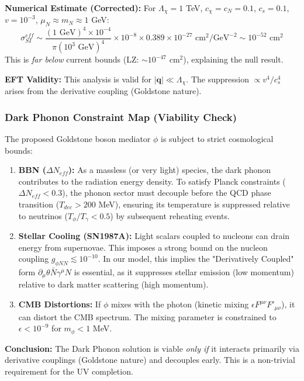 \documentclass[a4paper,12pt]{article}
\begin{document}
\textbf{Numerical Estimate (Corrected):}
For $\Lambda_\chi = 1$ TeV, $c_\chi = c_N = 0.1$, $c_s = 0.1$, $v = 10^{-3}$, $\mu_N \approx m_N \approx 1$ GeV:
\begin{equation}
\sigma_{SI}^{eff} \sim \frac{(1 \text{ GeV})^4 \times 10^{-4}}{\pi (10^3 \text{ GeV})^4} \times 10^{-8} \times 0.389 \times 10^{-27} \text{ cm}^2/\text{GeV}^{-2} \sim 10^{-52} \text{ cm}^2
\end{equation}
This is \emph{far below} current bounds (LZ: $\sim 10^{-47}$ cm$^2$), explaining the null result.

\textbf{EFT Validity:} This analysis is valid for $|\mathbf{q}| \ll \Lambda_\chi$. The suppression $\propto v^4/c_s^4$ arises from the derivative coupling (Goldstone nature).

\subsubsection{Dark Phonon Constraint Map (Viability Check)}
The proposed Goldstone boson mediator $\phi$ is subject to strict cosmological bounds:

\begin{enumerate}
    \item \textbf{BBN ($\Delta N_{eff}$):} As a massless (or very light) species, the dark phonon contributes to the radiation energy density. To satisfy Planck constraints ($\Delta N_{eff} < 0.3$), the phonon sector must decouple before the QCD phase transition ($T_{dec} > 200$ MeV), ensuring its temperature is suppressed relative to neutrinos ($T_\phi / T_\gamma < 0.5$) by subsequent reheating events.
    \item \textbf{Stellar Cooling (SN1987A):} Light scalars coupled to nucleons can drain energy from supernovae. This imposes a strong bound on the nucleon coupling $g_{\phi NN} \lesssim 10^{-10}$. In our model, this implies the "Derivatively Coupled" form $\partial_\mu \theta \bar{N} \gamma^\mu N$ is essential, as it suppresses stellar emission (low momentum) relative to dark matter scattering (high momentum).
    \item \textbf{CMB Distortions:} If $\phi$ mixes with the photon (kinetic mixing $\epsilon F^{\mu\nu} F'_{\mu\nu}$), it can distort the CMB spectrum. The mixing parameter is constrained to $\epsilon < 10^{-9}$ for $m_\phi < 1$ MeV.
\end{enumerate}
\textbf{Conclusion:} The Dark Phonon solution is viable \emph{only if} it interacts primarily via derivative couplings (Goldstone nature) and decouples early. This is a non-trivial requirement for the UV completion.
\end{document}
